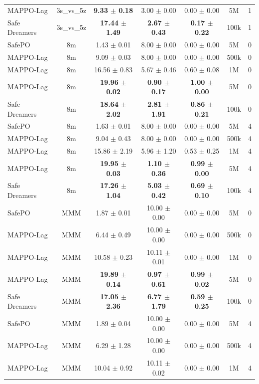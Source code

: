\begin{longtable}{lcccccc}
MAPPO-Lag & 3s\_vs\_5z & \textbf{9.33 $\pm$ 0.18} & 3.00 $\pm$ 0.00 & 0.00 $\pm$ 0.00 & 5M & 1 \\
Safe Dreamers & 3s\_vs\_5z & \textbf{17.44 $\pm$ 1.49} & \textbf{2.67 $\pm$ 0.43} & \textbf{0.17 $\pm$ 0.22} & 100k & 1 \\
\midrule
SafePO & 8m & 1.43 $\pm$ 0.01 & 8.00 $\pm$ 0.00 & 0.00 $\pm$ 0.00 & 5M & 0 \\
MAPPO-Lag & 8m & 9.09 $\pm$ 0.03 & 8.00 $\pm$ 0.00 & 0.00 $\pm$ 0.00 & 500k & 0 \\
MAPPO-Lag & 8m & 16.56 $\pm$ 0.83 & 5.67 $\pm$ 0.46 & 0.60 $\pm$ 0.08 & 1M & 0 \\
MAPPO-Lag & 8m & \textbf{19.96 $\pm$ 0.02} & \textbf{0.90 $\pm$ 0.17} & \textbf{1.00 $\pm$ 0.00} & 5M & 0 \\
Safe Dreamers & 8m & \textbf{18.64 $\pm$ 2.02} & \textbf{2.81 $\pm$ 1.91} & \textbf{0.86 $\pm$ 0.21} & 100k & 0 \\
\midrule
SafePO & 8m & 1.63 $\pm$ 0.01 & 8.00 $\pm$ 0.00 & 0.00 $\pm$ 0.00 & 5M & 4 \\
MAPPO-Lag & 8m & 9.04 $\pm$ 0.43 & 8.00 $\pm$ 0.00 & 0.00 $\pm$ 0.00 & 500k & 4 \\
MAPPO-Lag & 8m & 15.86 $\pm$ 2.19 & 5.96 $\pm$ 1.20 & 0.53 $\pm$ 0.25 & 1M & 4 \\
MAPPO-Lag & 8m & \textbf{19.95 $\pm$ 0.03} & \textbf{1.10 $\pm$ 0.36} & \textbf{0.99 $\pm$ 0.00} & 5M & 4 \\
Safe Dreamers & 8m & \textbf{17.26 $\pm$ 1.04} & \textbf{5.03 $\pm$ 0.42} & \textbf{0.69 $\pm$ 0.10} & 100k & 4 \\
\midrule
SafePO & MMM & 1.87 $\pm$ 0.01 & 10.00 $\pm$ 0.00 & 0.00 $\pm$ 0.00 & 5M & 0 \\
MAPPO-Lag & MMM & 6.44 $\pm$ 0.49 & 10.00 $\pm$ 0.00 & 0.00 $\pm$ 0.00 & 500k & 0 \\
MAPPO-Lag & MMM & 10.58 $\pm$ 0.23 & 10.11 $\pm$ 0.01 & 0.00 $\pm$ 0.00 & 1M & 0 \\
MAPPO-Lag & MMM & \textbf{19.89 $\pm$ 0.14} & \textbf{0.97 $\pm$ 0.61} & \textbf{0.99 $\pm$ 0.02} & 5M & 0 \\
Safe Dreamers & MMM & \textbf{17.05 $\pm$ 2.36} & \textbf{6.77 $\pm$ 1.79} & \textbf{0.59 $\pm$ 0.25} & 100k & 0 \\
\midrule
SafePO & MMM & 1.89 $\pm$ 0.04 & 10.00 $\pm$ 0.00 & 0.00 $\pm$ 0.00 & 5M & 4 \\
MAPPO-Lag & MMM & 6.29 $\pm$ 1.28 & 10.00 $\pm$ 0.00 & 0.00 $\pm$ 0.00 & 500k & 4 \\
MAPPO-Lag & MMM & 10.04 $\pm$ 0.92 & 10.11 $\pm$ 0.02 & 0.00 $\pm$ 0.00 & 1M & 4 \\

\end{longtable}
